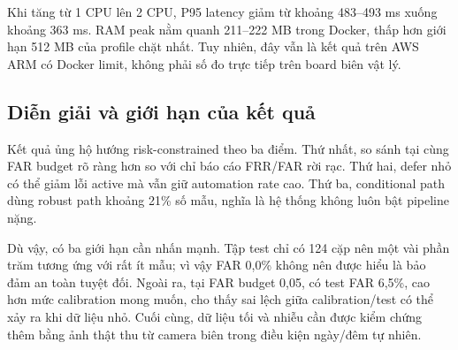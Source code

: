 Khi tăng từ 1 CPU lên 2 CPU, P95 latency giảm từ khoảng 483--493 ms xuống khoảng 363 ms. RAM peak nằm quanh 211--222 MB trong Docker, thấp hơn giới hạn 512 MB của profile chặt nhất. Tuy nhiên, đây vẫn là kết quả trên AWS ARM có Docker limit, không phải số đo trực tiếp trên board biên vật lý.

\subsection{Diễn giải và giới hạn của kết quả}

Kết quả ủng hộ hướng risk-constrained theo ba điểm. Thứ nhất, so sánh tại cùng FAR budget rõ ràng hơn so với chỉ báo cáo FRR/FAR rời rạc. Thứ hai, defer nhỏ có thể giảm lỗi active mà vẫn giữ automation rate cao. Thứ ba, conditional path dùng robust path khoảng 21\% số mẫu, nghĩa là hệ thống không luôn bật pipeline nặng.

Dù vậy, có ba giới hạn cần nhấn mạnh. Tập test chỉ có 124 cặp nên một vài phần trăm tương ứng với rất ít mẫu; vì vậy FAR 0,0\% không nên được hiểu là bảo đảm an toàn tuyệt đối. Ngoài ra, tại FAR budget 0,05,  có test FAR 6,5\%, cao hơn mức calibration mong muốn, cho thấy sai lệch giữa calibration/test có thể xảy ra khi dữ liệu nhỏ. Cuối cùng, dữ liệu tối và nhiễu cần được kiểm chứng thêm bằng ảnh thật thu từ camera biên trong điều kiện ngày/đêm tự nhiên.
